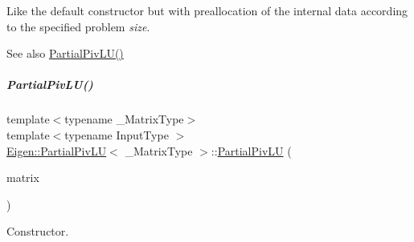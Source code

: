 Like the default constructor but with preallocation of the internal data according to the specified problem {\itshape size}. \begin{DoxySeeAlso}{See also}
\hyperlink{group___l_u___module_a5c04818d354f94a98786d8a44cb709c6}{Partial\+Piv\+L\+U()} 
\end{DoxySeeAlso}
\mbox{\label{group___l_u___module_a66a51f5fe47553d13ac92dc2374c3420}} 
\subparagraph{\texorpdfstring{Partial\+Piv\+L\+U()}{PartialPivLU()}\hspace{0.1cm}{\footnotesize\ttfamily [7/8]}}
{\footnotesize\ttfamily template$<$typename \+\_\+\+Matrix\+Type$>$ \\
template$<$typename Input\+Type $>$ \\
\hyperlink{group___l_u___module_class_eigen_1_1_partial_piv_l_u}{Eigen\+::\+Partial\+Piv\+LU}$<$ \+\_\+\+Matrix\+Type $>$\+::\hyperlink{group___l_u___module_class_eigen_1_1_partial_piv_l_u}{Partial\+Piv\+LU} (\begin{DoxyParamCaption}\item[{const \hyperlink{group___core___module_struct_eigen_1_1_eigen_base}{Eigen\+Base}$<$ Input\+Type $>$ \&}]{matrix }\end{DoxyParamCaption})\hspace{0.3cm}{\ttfamily [explicit]}}

Constructor.


